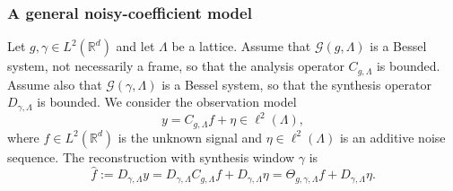 \documentclass[final,1p,times,authoryear]{elsarticle}
\theoremstyle{definition}
\newcommand{\R}{\mathbb{R}}
\newcommand{\1}{\mathbf{1}}
\begin{document}
\subsubsection{A general noisy-coefficient model}
Let $g,\gamma\in L^2(\R^d)$ and let $\Lambda$ be a lattice.
Assume that $\mathcal G(g,\Lambda)$ is a Bessel system, not necessarily a frame, so that
the analysis operator $C_{g,\Lambda}$ is bounded. Assume also that $\mathcal G(\gamma,\Lambda)$
is a Bessel system, so that the synthesis operator $D_{\gamma,\Lambda}$ is bounded.
We consider the observation model
$$
y = C_{g,\Lambda} f + \eta \in \ell^2(\Lambda),
$$
where $f\in L^2(\R^d)$ is the unknown signal and $\eta\in\ell^2(\Lambda)$ is an additive noise sequence.
The reconstruction with synthesis window $\gamma$ is
$$
\widehat f := D_{\gamma,\Lambda}y
= D_{\gamma,\Lambda}C_{g,\Lambda}f + D_{\gamma,\Lambda}\eta
= \Theta_{g,\gamma,\Lambda}f + D_{\gamma,\Lambda}\eta.
$$
\end{document}
